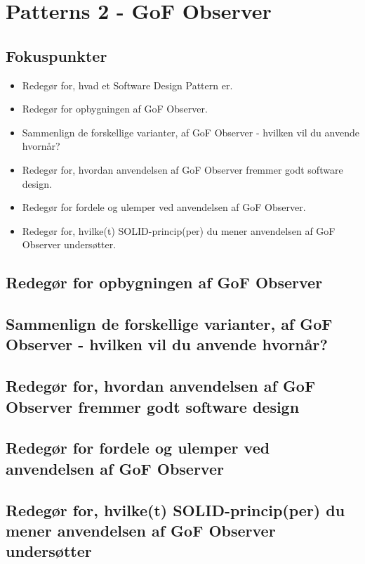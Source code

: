 \section{Patterns 2 - GoF Observer}

\subsection{Fokuspunkter}

\begin{itemize}
	\item Redegør for, hvad et Software Design Pattern er.
	\item Redegør for opbygningen af GoF Observer.
	\item Sammenlign de forskellige varianter, af GoF Observer - hvilken vil du anvende hvornår?
	\item Redegør for, hvordan anvendelsen af GoF Observer fremmer godt software design.
	\item Redegør for fordele og ulemper ved anvendelsen af GoF Observer.
	\item Redegør for, hvilke(t) SOLID-princip(per) du mener anvendelsen af GoF Observer undersøtter.
\end{itemize}



\subsection{Redegør for opbygningen af GoF Observer}

\subsection{Sammenlign de forskellige varianter, af GoF Observer - hvilken vil du anvende hvornår?}

\subsection{Redegør for, hvordan anvendelsen af GoF Observer fremmer godt software design}

\subsection{Redegør for fordele og ulemper ved anvendelsen af GoF Observer}

\subsection{Redegør for, hvilke(t) SOLID-princip(per) du mener anvendelsen af GoF Observer undersøtter}